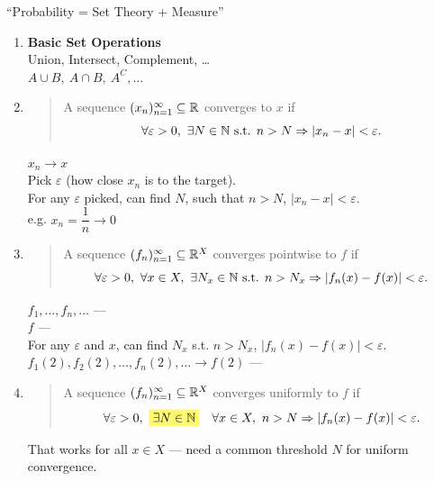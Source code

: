 

``Probability = Set Theory + Measure''

\begin{enumerate}
    \item \textbf{Basic Set Operations}
    \\ Union, Intersect, Complement, \dots
    \\ $A\cup B,\ A\cap B,\ A^C, \dots$

    \item {}
    \begin{quote}
        A sequence $(x_n)_{n=1}^\infty \subseteq \mathbb{R}$ converges to $x$ if
        \[\forall \varepsilon>0,\ \exists N \in \mathbb{N} \text{ s.t. } n>N \Rightarrow \left\lvert x_n-x\right\rvert < \varepsilon.\]
    \end{quote}
    $x_n \to x$ 
    \\ Pick $\varepsilon$ (how close $x_n$ is to the target).
    \\ For any $\varepsilon$ picked, can find $N$, such that $n>N$, $\left\lvert x_n-x\right\rvert < \varepsilon$.
    \\ e.g. $x_n = \dfrac{1}{n} \to 0$

    \item {}
    \begin{quote}
        A sequence $(f_n)_{n=1}^\infty \subseteq \mathbb{R}^X$ converges pointwise to $f$  if
        \[\forall \varepsilon>0,\ \forall x \in X,\ \exists N_x \in \mathbb{N} \text{ s.t. } n>N_x \Rightarrow \left\lvert f_n(x)-f(x)\right\rvert < \varepsilon.\]
    \end{quote}
    $f_1,\dots,f_n,\dots$ --- 
    \\ $f$ --- 
    \\ For any $\varepsilon$ and $x$, can find $N_x$ s.t. $n>N_x$, $\left\lvert f_n(x)-f(x)\right\rvert < \varepsilon$.
    \\ $f_1(2), f_2(2), \dots, f_n(2), \dots \to f(2)$ --- 

    \item {}
    \begin{quote}
        A sequence $(f_n)_{n=1}^\infty \subseteq \mathbb{R}^X$ converges uniformly to $f$ if
        \[\forall \varepsilon>0,\ \hly{\exists N \in \N} \quad \forall x \in X,\ n>N \Rightarrow \left\lvert f_n(x)-f(x)\right\rvert < \varepsilon.\]
    \end{quote}
    That works for all $x \in X$ --- need a common threshold $N$ for uniform convergence.
\end{enumerate}

